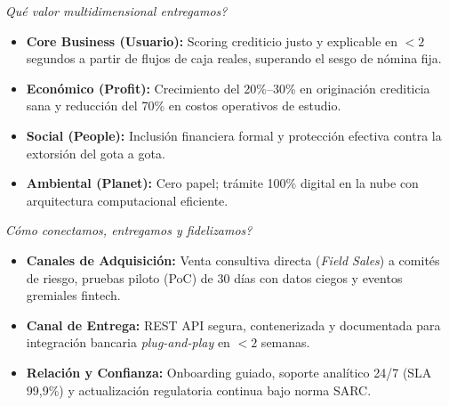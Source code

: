 \documentclass[11pt,a4paper]{article}
\begin{document}
\vspace{0.4cm}

\noindent
\begin{minipage}[t]{0.485\textwidth}
    \begin{tcolorbox}[colback=lightgray!50,colframe=secondary,arc=2mm,title={\textbf{\small BLOQUE 3 (P2): PORTAFOLIO DE VALOR}},coltitle=white,fonttitle=\bfseries]
        \textit{\footnotesize \textquestiondown Qu\'e valor multidimensional entregamos?}\\[0.2cm]
        \begin{itemize}[leftmargin=*,noitemsep,topsep=2pt]
            \item \textbf{Core Business (Usuario):} Scoring crediticio justo y explicable en $<2$ segundos a partir de flujos de caja reales, superando el sesgo de n\'omina fija.
            \item \textbf{Econ\'omico (Profit):} Crecimiento del 20\%--30\% en originaci\'on crediticia sana y reducci\'on del 70\% en costos operativos de estudio.
            \item \textbf{Social (People):} Inclusi\'on financiera formal y protecci\'on efectiva contra la extorsi\'on del gota a gota.
            \item \textbf{Ambiental (Planet):} Cero papel; tr\'amite 100\% digital en la nube con arquitectura computacional eficiente.
        \end{itemize}
    \end{tcolorbox}
\end{minipage}
\hfill
\begin{minipage}[t]{0.485\textwidth}
    \begin{tcolorbox}[colback=lightgray!50,colframe=secondary,arc=2mm,title={\textbf{\small BLOQUE 7 (P3): CANALES Y RELACI\'ON}},coltitle=white,fonttitle=\bfseries]
        \textit{\footnotesize \textquestiondown C\'omo conectamos, entregamos y fidelizamos?}\\[0.2cm]
        \begin{itemize}[leftmargin=*,noitemsep,topsep=2pt]
            \item \textbf{Canales de Adquisici\'on:} Venta consultiva directa (\textit{Field Sales}) a comit\'es de riesgo, pruebas piloto (PoC) de 30 d\'ias con datos ciegos y eventos gremiales fintech.
            \item \textbf{Canal de Entrega:} REST API segura, contenerizada y documentada para integraci\'on bancaria \textit{plug-and-play} en $<2$ semanas.
            \item \textbf{Relaci\'on y Confianza:} Onboarding guiado, soporte anal\'itico 24/7 (SLA 99,9\%) y actualizaci\'on regulatoria continua bajo norma SARC.
        \end{itemize}
    \end{tcolorbox}
\end{minipage}
\end{document}
